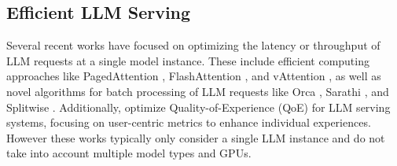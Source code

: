 
\subsection{Efficient LLM Serving}

Several recent works have focused on optimizing the latency or throughput of LLM requests at a single model instance. These include efficient computing approaches like PagedAttention \cite{kwon2023efficient}, FlashAttention \cite{dao2022flashattention}, and vAttention \cite{prabhu2024vattention}, as well as novel  algorithms for batch processing of LLM requests like Orca \cite{orca}, Sarathi \cite{agrawal2024taming}, and Splitwise \cite{patel2024splitwise}.  Additionally, \cite{liu2024andes} optimize Quality-of-Experience (QoE) for LLM serving systems, focusing on user-centric metrics to enhance individual experiences. However these works typically only consider a single LLM instance and do not take into account multiple model types and GPUs.



